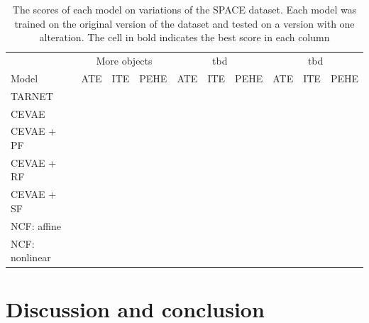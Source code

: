 \documentclass{report}
\begin{document}
\begin{table}[]
    \centering
    \begin{adjustbox}{center}
    \begin{tabular}{l||c|c|c||c|c|c||c|c|c|}
        & \multicolumn{3}{|c||}{More objects} & \multicolumn{3}{|c||}{tbd} & \multicolumn{3}{|c|}{tbd} \\ 
        Model & ATE & ITE & PEHE & ATE & ITE & PEHE & ATE & ITE & PEHE \\
        \hline \hline
        TARNET &  \\
        \hline
        CEVAE & \\
        \hline
        CEVAE + PF & \\
        \hline
        CEVAE + RF & \\
        \hline 
        CEVAE + SF & \\
        \hline
        NCF: affine & \\
        \hline
        NCF: nonlinear & \\
    \end{tabular}
    \end{adjustbox}
    \caption{The scores of each model on variations of the SPACE dataset. Each model was trained on the original version of the dataset and tested on a version with one alteration. The cell in bold indicates the best score in each column}
    \label{tab:results_experiments_space}
\end{table}


\chapter{Discussion and conclusion}




\end{document}
